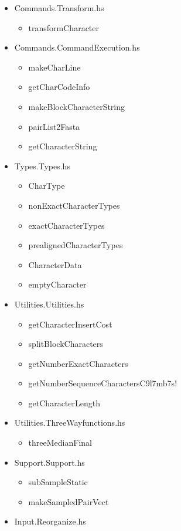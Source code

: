 \documentclass[11pt]{article}
\begin{document}
\begin{itemize}
			 \item{Commands.Transform.hs}
				\begin{itemize}
				\item{transformCharacter}
			\end{itemize}
			 \item{Commands.CommandExecution.hs}
				\begin{itemize}
				\item{makeCharLine}
				\item{getCharCodeInfo}
				\item{makeBlockCharacterString}
				\item{pairList2Fasta}
				\item{getCharacterString}
				\end{itemize}
			 \item{Types.Types.hs}
				 \begin{itemize}
				 	\item{CharType}
				 	\item{nonExactCharacterTypes}
				 	\item{exactCharacterTypes}
				 	\item{prealignedCharacterTypes}
				 	\item{CharacterData}
				 	\item{emptyCharacter}
				 \end{itemize}
			 \item{Utilities.Utilities.hs}
				\begin{itemize}
					\item{getCharacterInsertCost}
					\item{splitBlockCharacters}
					\item{getNumberExactCharacters}
					\item{getNumberSequenceCharactersC9l7mb7s!
					}
					\item{getCharacterLength}
				\end{itemize}
			 \item{Utilities.ThreeWayfunctions.hs}
				\begin{itemize}
					\item{threeMedianFinal}
				\end{itemize}
			 \item{Support.Support.hs}
				\begin{itemize}
					\item{subSampleStatic}
					\item{makeSampledPairVect}
				\end{itemize}
			 \item{Input.Reorganize.hs}

\end{itemize}
\end{document}
